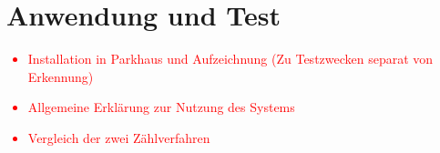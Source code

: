 \section{Anwendung und Test}\label{ch:Test}

\textcolor{red}{
	\begin{itemize}
		\item Installation in Parkhaus und Aufzeichnung (Zu Testzwecken separat von Erkennung)
		\item Allgemeine Erklärung zur Nutzung des Systems
		\item Vergleich der zwei Zählverfahren
	\end{itemize}
}
